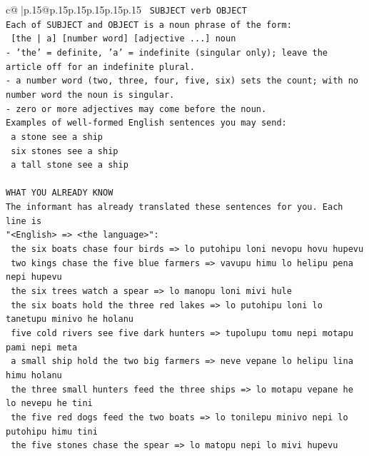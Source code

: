 \documentclass{article}
\begin{document}
{\begin{supertabular}{c@{$\;$}|p{.15\linewidth}@{}p{.15\linewidth}p{.15\linewidth}p{.15\linewidth}p{.15\linewidth}p{.15\linewidth}}
{{{\texttt{    SUBJECT  verb  OBJECT} \\
\texttt{Each of SUBJECT and OBJECT is a noun phrase of the form:} \\
\texttt{    {[}the | a{]}  {[}number word{]}  {[}adjective ...{]}  noun} \\
\texttt{{-} 'the' = definite, 'a' = indefinite (singular only); leave the article off for an indefinite plural.} \\
\texttt{{-} a number word (two, three, four, five, six) sets the count; with no number word the noun is singular.} \\
\texttt{{-} zero or more adjectives may come before the noun.} \\
\texttt{Examples of well{-}formed English sentences you may send:} \\
\texttt{    a stone see a ship} \\
\texttt{    six stones see a ship} \\
\texttt{    a tall stone see a ship} \\
\\ 
\texttt{WHAT YOU ALREADY KNOW} \\
\texttt{The informant has already translated these sentences for you. Each line is} \\
\texttt{"<English>  =>  <the language>":} \\
\texttt{    the six boats chase four birds  =>  lo putohipu loni nevopu hovu hupevu} \\
\texttt{    two kings chase the five blue farmers  =>  vavupu himu lo helipu pena nepi hupevu} \\
\texttt{    the six trees watch a spear  =>  lo manopu loni mivi hule} \\
\texttt{    the six boats hold the three red lakes  =>  lo putohipu loni lo tanetupu minivo he holanu} \\
\texttt{    five cold rivers see five dark hunters  =>  tupolupu tomu nepi motapu pami nepi meta} \\
\texttt{    a small ship hold the two big farmers  =>  neve vepane lo helipu lina himu holanu} \\
\texttt{    the three small hunters feed the three ships  =>  lo motapu vepane he lo nevepu he tini} \\
\texttt{    the five red dogs feed the two boats  =>  lo tonilepu minivo nepi lo putohipu himu tini} \\
\texttt{    the five stones chase the spear  =>  lo matopu nepi lo mivi hupevu} \\
}}}
\end{supertabular}}
\end{document}

